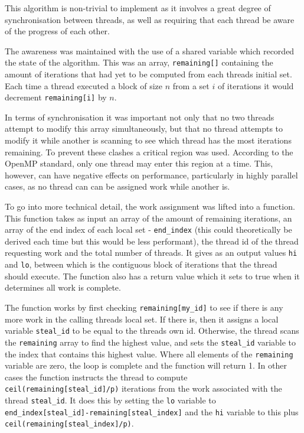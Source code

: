 \documentclass[a4paper,12pt]{article}
\begin{document}
This algorithm is non-trivial to implement as it involves a great degree of synchronisation between threads, as well as requiring that each thread be aware of the progress of each other.

The awareness was maintained with the use of a shared variable which recorded the state of the algorithm. This was an array, \verb|remaining[]| containing the amount of iterations that had yet to be computed from each threads initial set. Each time a thread executed a block of size $n$ from a set $i$ of iterations it would decrement \verb|remaining[i]| by $n$.

In terms of synchronisation it was important not only that no two threads attempt to modify this array simultaneously, but that no thread attempts to modify it while another is scanning to see which thread has the most iterations remaining. To prevent these clashes a critical region was used. According to the OpenMP standard,  only one thread may enter this region at a time. This, however, can have negative effects on performance, particularly in highly parallel cases, as no thread can can be assigned work while another is.

To go into more technical detail, the work assignment was lifted into a function. This function takes as input an array of the amount of remaining iterations, an array of the end index of each local set - \verb|end_index| (this could theoretically be derived each time but this would be less performant), the thread id of the thread requesting work and the total number of threads. It gives as an output values \verb|hi| and \verb|lo|, between which is the contiguous block of iterations that the thread should execute. The function also has a return value which it sets to true when it determines all work is complete.

The function works by first checking \verb|remaining[my_id]| to see if there is any more work in the calling threads local set. If there is, then it assigns a local variable \verb|steal_id| to be equal to the threads own id. Otherwise, the thread scans the \verb|remaining| array to find the highest value, and sets the \verb|steal_id| variable to the index that contains this highest value. Where all elements of the \verb|remaining| variable are zero, the loop is complete and the function will return 1. In other cases the function instructs the thread to compute \verb|ceil(remaining[steal_id]/p)| iterations from the work associated with the thread \verb|steal_id|. It does this by setting the \verb|lo| variable to \verb|end_index[steal_id]-remaining[steal_index]| and the \verb|hi| variable to this plus \verb|ceil(remaining[steal_index]/p)|.
\end{document}
